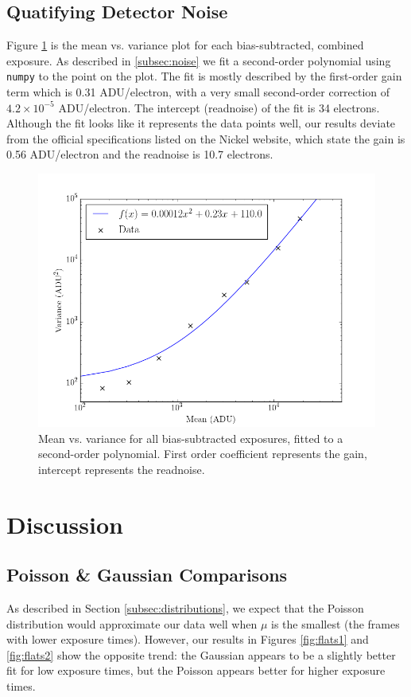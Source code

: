 \documentclass[preprint]{aastex62}
\begin{document}
\subsection{Quatifying Detector Noise} \label{subsec:gain}
Figure \ref{fig:mean_var} is the mean vs. variance plot for each bias-subtracted, combined exposure. As described in \ref{subsec:noise} we fit a second-order polynomial using {\tt numpy} to the point on the plot. The fit is mostly described by the first-order gain term which is 0.31 ADU/electron, with a very small second-order correction of $4.2\times10^{-5}$ ADU/electron. The intercept (readnoise) of the fit is 34 electrons. Although the fit looks like it represents the data points well, our results deviate from the official specifications listed on the Nickel website, which state the gain is 0.56 ADU/electron and the readnoise is 10.7 electrons.

\begin{figure}[H]
\begin{center}
\includegraphics[width=.48\linewidth]{plots/mean_vs_variance.png}
\caption{Mean vs. variance for all bias-subtracted exposures, fitted to a second-order polynomial. First order coefficient represents the gain, intercept represents the readnoise.} \label{fig:mean_var}
\end{center}
\end{figure}

\section{Discussion}
\subsection{Poisson \& Gaussian Comparisons} \label{subsec:dist_comparisons}
As described in Section \ref{subsec:distributions}, we expect that the Poisson distribution would approximate our data well when $\mu$ is the smallest (the frames with lower exposure times). However, our results in Figures \ref{fig:flats1} and \ref{fig:flats2} show the opposite trend: the Gaussian appears to be a slightly better fit for low exposure times, but the Poisson appears better for higher exposure times.
\end{document}
